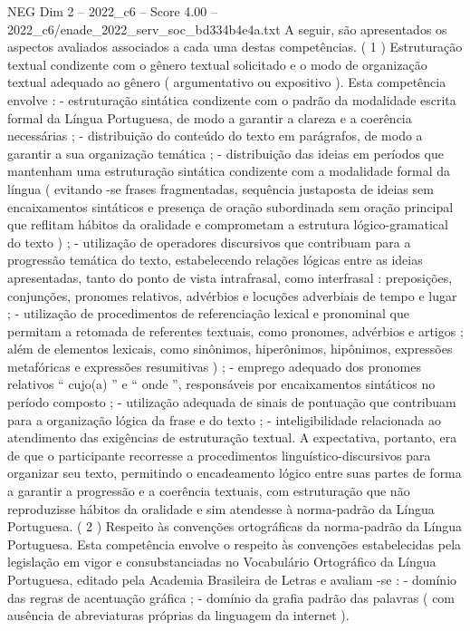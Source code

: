 \begin{textsample}{NEG Dim 2 – 2022\_c6 – Score 4.00 – 2022\_c6/enade\_2022\_serv\_soc\_bd334b4e4a.txt}
A seguir, são apresentados os aspectos avaliados associados a cada uma destas competências. ( 1 ) Estruturação textual condizente com o gênero textual solicitado e o modo de organização textual adequado ao gênero ( argumentativo ou expositivo ).
Esta competência envolve : - estruturação sintática condizente com o padrão da modalidade escrita formal da Língua Portuguesa, de modo a garantir a clareza e a coerência necessárias ; - distribuição do conteúdo do texto em parágrafos, de modo a garantir a sua organização temática ; - distribuição das ideias em períodos que mantenham uma estruturação sintática condizente com a modalidade formal da língua ( evitando -se frases fragmentadas, sequência justaposta de ideias sem encaixamentos sintáticos e presença de oração subordinada sem oração principal que reflitam hábitos da oralidade e comprometam a estrutura lógico-gramatical do texto ) ; - utilização de operadores discursivos que contribuam para a progressão temática do texto, estabelecendo relações lógicas entre as ideias apresentadas, tanto do ponto de vista intrafrasal, como interfrasal : preposições, conjunções, pronomes relativos, advérbios e locuções adverbiais de tempo e lugar ; - utilização de procedimentos de referenciação lexical e pronominal que permitam a retomada de referentes textuais, como pronomes, advérbios e artigos ; além de elementos lexicais, como sinônimos, hiperônimos, hipônimos, expressões metafóricas e expressões resumitivas ) ; - emprego adequado dos pronomes relativos “ cujo(a) ” e “ onde ”, responsáveis por encaixamentos sintáticos no período composto ; - utilização adequada de sinais de pontuação que contribuam para a organização lógica da frase e do texto ; - inteligibilidade relacionada ao atendimento das exigências de estruturação textual.
A expectativa, portanto, era de que o participante recorresse a procedimentos linguístico-discursivos para organizar seu texto, permitindo o encadeamento lógico entre suas partes de forma a garantir a progressão e a coerência textuais, com estruturação que não reproduzisse hábitos da oralidade e sim atendesse à norma-padrão da Língua Portuguesa. ( 2 ) Respeito às convenções ortográficas da norma-padrão da Língua Portuguesa.
Esta competência envolve o respeito às convenções estabelecidas pela legislação em vigor e consubstanciadas no Vocabulário Ortográfico da Língua Portuguesa, editado pela Academia Brasileira de Letras e avaliam -se : - domínio das regras de acentuação gráfica ; - domínio da grafia padrão das palavras ( com ausência de abreviaturas próprias da linguagem da internet ).

\end{textsample}
